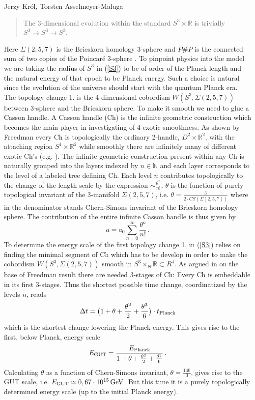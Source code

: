 \begin{artengenv2auth}{Jerzy Kr\'ol, Torsten Asselmeyer-Maluga}
\begin{quotation}
The 3-dimensional evolution within the standard $S^3\times \mathbb{R}$ is trivially $S^3\to S^3\to S^3$.
\end{quotation}
Here $\Sigma(2,5,7)$ is the Brieskorn homology 3-sphere and $P\# P$ is the connected sum of two copies of the Poincar{\'e} 3-sphere \parencite{AK2018,AK2019}. To pinpoint physics into the model we are taking the radius of $S^3$ in (\ref{S3}) to be of order of the Planck length and the natural energy of that epoch to be Planck energy. Such a choice is natural since the evolution of the universe should start with the quantum Planck era. The topology change 1. is the 4-dimensional cobordism $W(S^3,\Sigma(2,5,7))$ between 3-sphere and the Brieskorn sphere. To make it smooth we need to glue a Casson handle. A Casson handle (Ch) is the infinite geometric construction which becomes the main player in investigating of 4-exotic smoothness. As shown by Freedman every Ch is topologically the ordinary 2-handle, $D^2\times \mathbb{R}^2$, with the attaching region $S^1\times \mathbb{R}^2$ while smoothly there are infinitely many of different exotic Ch's (e.g. \cite{GS1999}). The infinite geometric construction present within any Ch is naturally grouped into the layers indexed by $n\in \mathbb{N}$ and each layer corresponds to the level of a labeled tree defining Ch. Each level $n$ contributes topologically to the change of the length scale by the expression $\sim \frac{\theta^n}{n!}$. $\theta$ is the function of purely topological invariant of the 3-manifold $\Sigma(2,5,7)$, i.e. $\theta =\frac{3}{2\cdot CS(\Sigma(2,5,7))}$ where in the denominator stands Chern-Simons invariant of the Brieskorn homology sphere. The contribution of the entire infinite Casson handle is thus given by \parencite{AK2018,AK2014,AK2019}
\begin{equation}\label{exp1} a=a_0\sum_{n=0}^{\infty}\frac{\theta^n}{n!}\,. \end{equation}
To determine the energy scale of the first topology change 1. in (\ref{S3}) relies on finding the minimal segment of Ch which has to be develop in order to make the cobordism $W(S^3,\Sigma(2,5,7))$ smooth in $S^3\times_{\Theta}\mathbb{R}\subset R^4$. As argued in \parencite{AK2014,AK2019} on the base of Freedman result there are needed 3-stages of Ch: Every Ch is embeddable in its first 3-stages. Thus the shortest possible time change, coordinatized by the levels $n$, reads \parencite{AK2014,AK2019} 
\[ \Delta t= \big(1+ \theta + \frac{\theta^2}{2}+\frac{\theta^3}{6}\big)\cdot t_{\rm Planck} \]
which is the shortest change lowering the Planck energy. This gives rise to the first, below Planck, energy scale
\[E_{\rm GUT}= \frac{E_{\rm Planck}}{1+ \theta + \frac{\theta^2}{2}+\frac{\theta^3}{6}}\,. \] 
Calculating $\theta$ as a function of Chern-Simons invariant, $\theta=\frac{140}{3}$, gives rise to the GUT scale, i.e. $E_{\rm GUT}\simeq 0,67\cdot 10^{15}\, {\rm GeV}$. But this time it is a purely topologically determined energy scale (up to the initial Planck energy). 


\end{artengenv2auth}

